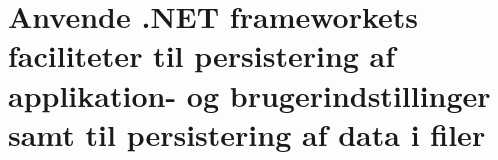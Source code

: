 \section{Anvende .NET frameworkets faciliteter til persistering af applikation- og brugerindstillinger samt til persistering af data i filer}\label{sec:spm6}